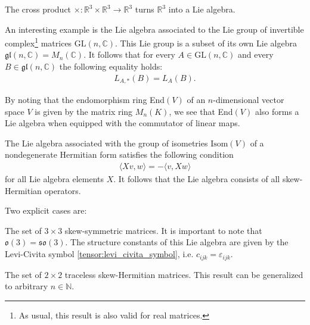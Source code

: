     \begin{example}
        The cross product $\times:\mathbb{R}^3\times\mathbb{R}^3\rightarrow\mathbb{R}^3$ turns $\mathbb{R}^3$ into a Lie algebra.
    \end{example}
    \begin{example}
        An interesting example is the Lie algebra associated to the Lie group of invertible complex\footnote{As usual, this result is also valid for real matrices.} matrices $\text{GL}(n, \mathbb{C})$. This Lie group is a subset of its own Lie algebra $\mathfrak{gl}(n, \mathbb{C}) = M_n(\mathbb{C})$. It follows that for every $A\in\text{GL}(n, \mathbb{C})$ and every $B\in\mathfrak{gl}(n, \mathbb{C})$ the following equality holds:
        \begin{gather}
            L_{A,\ast}(B) = L_A(B).
        \end{gather}
    \end{example}
    \begin{result}\label{lie:end_as_lie_algebra}
        By noting that the endomorphism ring End$(V)$ of an $n$-dimensional vector space $V$ is given by the matrix ring $M_n(K)$, we see that End$(V)$ also forms a Lie algebra when equipped with the commutator of linear maps.
    \end{result}

    \begin{example}[Isometries]
        The Lie algebra associated with the group of isometries $\text{Isom}(V)$ of a nondegenerate Hermitian form satisfies the following condition
        \begin{gather}
            \label{lie:lie_isometry}
            \langle Xv, w \rangle = -\langle v, Xw \rangle
        \end{gather}
        for all Lie algebra elements $X$. It follows that the Lie algebra consists of all skew-Hermitian operators.
    \end{example}
    Two explicit cases are:
    \begin{example}\label{lie:so3}
        The set of $3\times3$ skew-symmetric matrices. It is important to note that $\mathfrak{o}(3) = \mathfrak{so}(3)$. The structure constants of this Lie algebra are given by the Levi-Civita symbol \ref{tensor:levi_civita_symbol}, i.e. $c_{ijk} = \varepsilon_{ijk}$.
    \end{example}
    \begin{example}
        The set of $2\times2$ traceless skew-Hermitian matrices. This result can be generalized to arbitrary $n\in\mathbb{N}$.
    \end{example}

